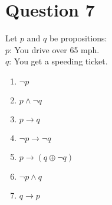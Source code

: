\documentclass[12pt]{extarticle}
\begin{document}
\section*{Question 7}
	Let $p$ and $q$ be propositions:\\
		\hspace*{1cm}$p$: You drive over 65 mph.\\
		\hspace*{1cm}$q$: You get a speeding ticket.\\
	\begin{enumerate}
		\item $\neg p$
		\item $p \wedge \neg q$
		\item $p \to q$
		\item $\neg p \to \neg q$
		\item $p \to (q \oplus \neg q)$
		\item $\neg p \wedge q$
		\item $q \to p$
	\end{enumerate}
\clearpage
\end{document}
